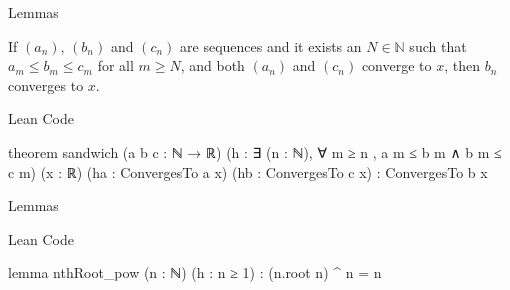 \documentclass{beamer}
\begin{document}
\begin{frame}[fragile]{Lemmas}
    \begin{lemma}
        If $(a_n)$, $(b_n)$ and $(c_n)$ are sequences and it exists an $N \in \mathbb{N}$ such that $a_m \leq b_m \leq c_m$ for all $m \geq N$, and both $(a_n)$ and $(c_n)$ converge to $x$, then $b_n$ converges to $x$.
    \end{lemma}

    \begin{block}{Lean Code}
    \begin{leancode}
    theorem sandwich (a b c : ℕ → ℝ) 
    (h : ∃ (n : ℕ), ∀ m ≥ n , a m ≤ b m ∧ b m ≤ c m) (x : ℝ)
    (ha : ConvergesTo a x) (hb : ConvergesTo c x) :
    ConvergesTo b x
    \end{leancode}
    \end{block}
\end{frame}

\begin{frame}[fragile]{Lemmas}
    \begin{lemma}
        
    \end{lemma}

    \begin{block}{Lean Code}
    \begin{leancode}
    lemma nthRoot_pow (n : ℕ) (h : n ≥ 1) : (n.root n) ^ n = n
    \end{leancode}
    \end{block}
\end{frame}
\end{document}
